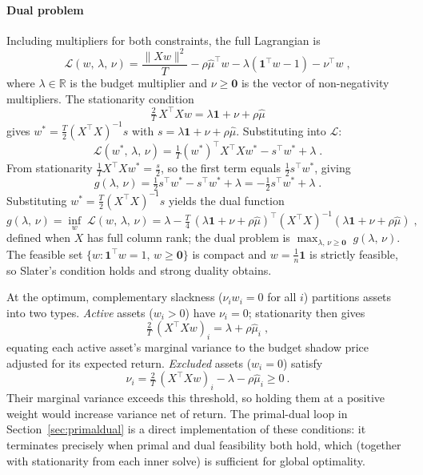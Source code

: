 \paragraph{Dual problem}
Including multipliers for both constraints, the full Lagrangian is
\[
\mathcal{L}(w,\, \lambda,\, \nu)
= \frac{\lVert Xw\rVert^2}{T} - \rho\hat\mu^\top w
  - \lambda(\mathbf{1}^\top w - 1) - \nu^\top w\;,
\]
where $\lambda\in\mathbb{R}$ is the budget multiplier and $\nu\geq\mathbf{0}$ is the vector of
non-negativity multipliers. The stationarity condition
\[
\tfrac{2}{T}\, X^\top X w = \lambda\mathbf{1}+\nu+\rho\hat\mu
\]
gives $w^* = \tfrac{T}{2}(X^\top X)^{-1}s$ with $s = \lambda\mathbf{1}+\nu+\rho\hat\mu$.
Substituting into $\mathcal{L}$:
\[
\mathcal{L}(w^*,\,\lambda,\,\nu)
= \tfrac{1}{T}(w^*)^\top X^\top X w^* - s^\top w^* + \lambda\;.
\]
From stationarity $\tfrac{1}{T}X^\top X w^* = \tfrac{s}{2}$, so the first term equals
$\tfrac{1}{2}s^\top w^*$, giving
\[
g(\lambda,\,\nu)
= \tfrac{1}{2}s^\top w^* - s^\top w^* + \lambda
= -\tfrac{1}{2}s^\top w^* + \lambda\;.
\]
Substituting $w^* = \tfrac{T}{2}(X^\top X)^{-1}s$ yields the dual function
\[
g(\lambda,\,\nu)
= \inf_w\; \mathcal{L}(w,\,\lambda,\,\nu)
= \lambda - \tfrac{T}{4}\,
  (\lambda\mathbf{1}+\nu+\rho\hat\mu)^\top(X^\top X)^{-1}
  (\lambda\mathbf{1}+\nu+\rho\hat\mu)\;,
\]
defined when $X$ has full column rank; the dual problem is
$\max_{\lambda,\,\nu\geq\mathbf{0}}\; g(\lambda,\,\nu)$.
The feasible set $\{w:\mathbf{1}^\top w=1,\,w\geq\mathbf{0}\}$ is compact and
$w=\tfrac{1}{n}\mathbf{1}$ is strictly feasible, so Slater's condition holds and
strong duality obtains.

At the optimum, complementary slackness ($\nu_i w_i = 0$ for all $i$) partitions assets
into two types. \emph{Active} assets ($w_i>0$) have $\nu_i=0$; stationarity then gives
\[
\tfrac{2}{T}\,(X^\top Xw)_i = \lambda+\rho\hat\mu_i\;,
\]
equating each active asset's marginal variance to the budget shadow price adjusted for its
expected return. \emph{Excluded} assets ($w_i=0$) satisfy
\[
\nu_i = \tfrac{2}{T}\,(X^\top Xw)_i - \lambda - \rho\hat\mu_i \geq 0~.
\]
Their marginal variance exceeds this threshold, so holding them at a positive weight would
increase variance net of return. The primal-dual loop in Section~\ref{sec:primaldual} is a direct
implementation of these conditions: it terminates precisely when primal and dual feasibility
both hold, which (together with stationarity from each inner solve) is sufficient for
global optimality.
